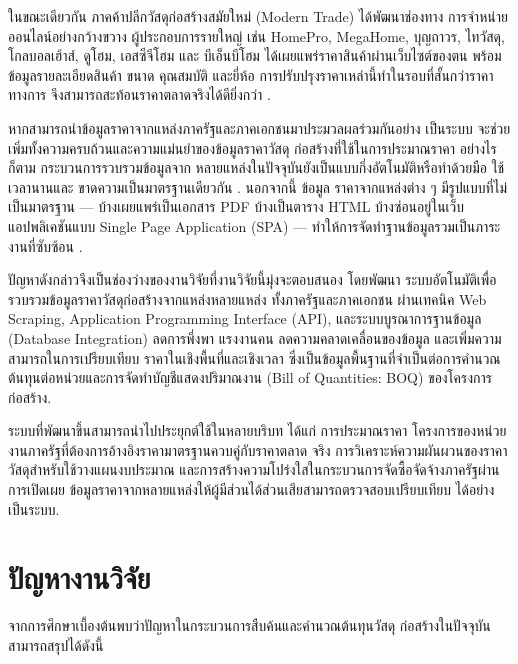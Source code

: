 ในขณะเดียวกัน ภาคค้าปลีกวัสดุก่อสร้างสมัยใหม่ (Modern Trade) ได้พัฒนาช่องทาง
การจำหน่ายออนไลน์อย่างกว้างขวาง ผู้ประกอบการรายใหญ่ เช่น HomePro,
MegaHome, บุญถาวร, ไทวัสดุ, โกลบอลเฮ้าส์, ดูโฮม, เอสซีจีโฮม และ บีเอ็นบีโฮม
ได้เผยแพร่ราคาสินค้าผ่านเว็บไซต์ของตน พร้อมข้อมูลรายละเอียดสินค้า ขนาด
คุณสมบัติ และยี่ห้อ การปรับปรุงราคาเหล่านี้ทำในรอบที่สั้นกว่าราคาทางการ
จึงสามารถสะท้อนราคาตลาดจริงได้ดียิ่งกว่า \cite{elmohr2022}.

หากสามารถนำข้อมูลราคาจากแหล่งภาครัฐและภาคเอกชนมาประมวลผลร่วมกันอย่าง
เป็นระบบ จะช่วยเพิ่มทั้งความครบถ้วนและความแม่นยำของข้อมูลราคาวัสดุ
ก่อสร้างที่ใช้ในการประมาณราคา อย่างไรก็ตาม กระบวนการรวบรวมข้อมูลจาก
หลายแหล่งในปัจจุบันยังเป็นแบบกึ่งอัตโนมัติหรือทำด้วยมือ ใช้เวลานานและ
ขาดความเป็นมาตรฐานเดียวกัน \cite{benchanakatkun2014}. นอกจากนี้ ข้อมูล
ราคาจากแหล่งต่าง ๆ มีรูปแบบที่ไม่เป็นมาตรฐาน — บ้างเผยแพร่เป็นเอกสาร PDF
บ้างเป็นตาราง HTML บ้างซ่อนอยู่ในเว็บแอปพลิเคชันแบบ Single Page Application
(SPA) — ทำให้การจัดทำฐานข้อมูลรวมเป็นภาระงานที่ซับซ้อน
\cite{rao2015,chunyaem2019}.

ปัญหาดังกล่าวจึงเป็นช่องว่างของงานวิจัยที่งานวิจัยนี้มุ่งจะตอบสนอง โดยพัฒนา
ระบบอัตโนมัติเพื่อรวบรวมข้อมูลราคาวัสดุก่อสร้างจากแหล่งหลายแหล่ง
ทั้งภาครัฐและภาคเอกชน ผ่านเทคนิค Web Scraping, Application Programming
Interface (API), และระบบบูรณาการฐานข้อมูล (Database Integration) ลดการพึ่งพา
แรงงานคน ลดความคลาดเคลื่อนของข้อมูล และเพิ่มความสามารถในการเปรียบเทียบ
ราคาในเชิงพื้นที่และเชิงเวลา ซึ่งเป็นข้อมูลพื้นฐานที่จำเป็นต่อการคำนวณ
ต้นทุนต่อหน่วยและการจัดทำบัญชีแสดงปริมาณงาน (Bill of Quantities: BOQ)
ของโครงการก่อสร้าง.

ระบบที่พัฒนาขึ้นสามารถนำไปประยุกต์ใช้ในหลายบริบท ได้แก่ การประมาณราคา
โครงการของหน่วยงานภาครัฐที่ต้องการอ้างอิงราคามาตรฐานควบคู่กับราคาตลาด
จริง การวิเคราะห์ความผันผวนของราคาวัสดุสำหรับใช้วางแผนงบประมาณ
และการสร้างความโปร่งใสในกระบวนการจัดซื้อจัดจ้างภาครัฐผ่านการเปิดเผย
ข้อมูลราคาจากหลายแหล่งให้ผู้มีส่วนได้ส่วนเสียสามารถตรวจสอบเปรียบเทียบ
ได้อย่างเป็นระบบ.

\section{ปัญหางานวิจัย}
\label{sec:problem}

จากการศึกษาเบื้องต้นพบว่าปัญหาในกระบวนการสืบค้นและคำนวณต้นทุนวัสดุ
ก่อสร้างในปัจจุบันสามารถสรุปได้ดังนี้

